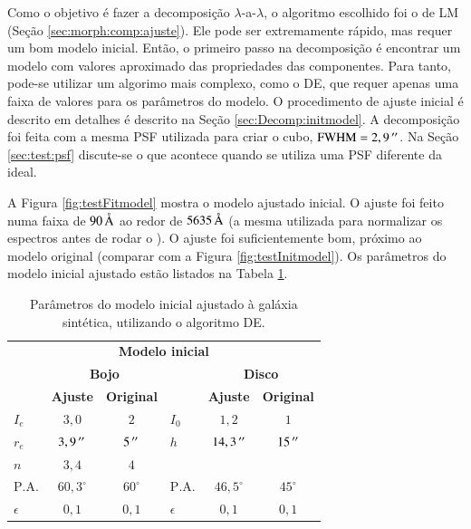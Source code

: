 
Como o objetivo é fazer a decomposição $\lambda$-a-$\lambda$, o algoritmo
escolhido foi o de LM (Seção \ref{sec:morph:comp:ajuste}). Ele pode ser
extremamente rápido, mas requer um bom modelo inicial. Então, o primeiro passo
na decomposição é encontrar um modelo com valores aproximado das propriedades
das componentes. Para tanto, pode-se utilizar um algorimo mais complexo, como o
DE, que requer apenas uma faixa de valores para os parâmetros do modelo.
O procedimento de ajuste inicial é descrito em detalhes é descrito na Seção
\ref{sec:Decomp:initmodel}. A decomposição foi feita com a mesma PSF utilizada
para criar o cubo, $\mathrm{FWHM} = 2,9\,^{\prime\prime}$. Na Seção \ref{sec:test:psf}
discute-se o que acontece quando se utiliza uma PSF diferente da ideal.

A Figura \ref{fig:testFitmodel} mostra o modelo ajustado inicial. O ajuste
foi feito numa faixa de $90\,\text{\normalfont\AA}$ ao redor de $5635\,\text{\normalfont\AA}$ (a
mesma utilizada para normalizar os espectros antes de rodar o \starlight).
O ajuste foi suficientemente bom, próximo ao modelo original (comparar com a
Figura \ref{fig:testInitmodel}). Os parâmetros do modelo inicial ajustado estão
listados na Tabela \ref{tab:testeModeloInicial}.

\begin{table}
\begin{tabular}{ l c c l c c }
  \hline
  \multicolumn{6}{c}{\textbf{Modelo inicial}} \\
  & \multicolumn{2}{c}{\textbf{Bojo}} & & \multicolumn{2}{c}{\textbf{Disco}} \\
  & \textbf{Ajuste} & \textbf{Original} & & \textbf{Ajuste} & \textbf{Original} \\
  \hline
  $I_e$ & $3,0$ & $2$ & $I_0$ & $1,2$ & $1$ \\
  $r_e$ & $3,9\,^{\prime\prime}$ & $5\,^{\prime\prime}$ & $h$ & $14,3\,^{\prime\prime}$ & $15\,^{\prime\prime}$\\
  $n$ & $3,4$ & $4$ & & & \\
  $\mathrm{P.A.}$ & $60,3^\circ$ & $60^\circ$ & $\mathrm{P.A.}$ & $46,5^\circ$ &
  $45^\circ$ \\
  $\epsilon$ & $0,1$ & $0,1$ & $\epsilon$ & $0,1$ & $0,1$ \\
  \hline
\end{tabular}
\caption[Modelo inicial ajustado à galáxia sintética]
{Parâmetros do modelo inicial ajustado à galáxia sintética, utilizando o
algoritmo DE.}
\label{tab:testeModeloInicial}
\end{table}



